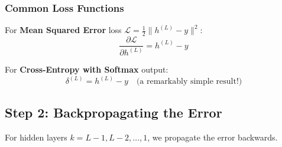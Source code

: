 \subsubsection{Common Loss Functions}

For \textbf{Mean Squared Error} loss $\mathcal{L} = \frac{1}{2}\|h^{(L)} - y\|^2$:
\[
\frac{\partial \mathcal{L}}{\partial h^{(L)}} = h^{(L)} - y
\]

For \textbf{Cross-Entropy with Softmax} output:
\[
\delta^{(L)} = h^{(L)} - y \quad \text{(a remarkably simple result!)}
\]

\subsection{Step 2: Backpropagating the Error}

For hidden layers $k = L-1, L-2, \ldots, 1$, we propagate the error backwards.

